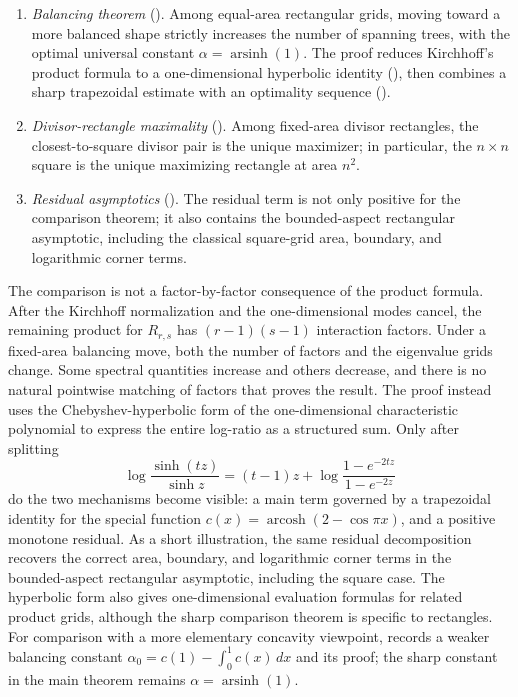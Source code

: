 \documentclass[11pt]{article}
\numberwithin{equation}{section}
\DeclareMathOperator{\arcosh}{arcosh}
\DeclareMathOperator{\arsinh}{arsinh}
\begin{document}
\begin{enumerate}
\setlength{\itemsep}{1pt}
\setlength{\parsep}{0pt}
\setlength{\topsep}{2pt}
        \item[(1)] \emph{Balancing theorem} (\textbf{}). Among equal-area rectangular grids, moving toward a more balanced shape strictly increases the number of spanning trees, with the optimal universal constant $\alpha=\arsinh(1)$. The proof reduces Kirchhoff's product formula to a one-dimensional hyperbolic identity (\textbf{}), then combines a sharp trapezoidal estimate with an optimality sequence (\textbf{}).
\item[(2)] \emph{Divisor-rectangle maximality} (\textbf{}). Among fixed-area divisor rectangles, the closest-to-square divisor pair is the unique maximizer; in particular, the $n\times n$ square is the unique maximizing rectangle at area $n^2$.
\item[(3)] \emph{Residual asymptotics} (\textbf{}). The residual term is not only positive for the comparison theorem; it also contains the bounded-aspect rectangular asymptotic, including the classical square-grid area, boundary, and logarithmic corner terms.
\end{enumerate}

The comparison is not a factor-by-factor consequence of the product formula. After the Kirchhoff normalization and the one-dimensional modes cancel, the remaining product for $R_{r,s}$ has $(r-1)(s-1)$ interaction factors. Under a fixed-area balancing move, both the number of factors and the eigenvalue grids change. Some spectral quantities increase and others decrease, and there is no natural pointwise matching of factors that proves the result. The proof instead uses the Chebyshev-hyperbolic form of the one-dimensional characteristic polynomial to express the entire log-ratio as a structured sum. Only after splitting
\[
  \log\frac{\sinh(tz)}{\sinh z}
  =
  (t-1)z+\log\frac{1-e^{-2tz}}{1-e^{-2z}}
\]
do the two mechanisms become visible: a main term governed by a trapezoidal identity for the special function $c(x)=\arcosh(2-\cos \pi x)$, and a positive monotone residual.
As a short illustration, the same residual decomposition recovers the correct area, boundary, and logarithmic corner terms in the bounded-aspect rectangular asymptotic, including the square case. The hyperbolic form also gives one-dimensional evaluation formulas for related product grids, although the sharp comparison theorem is specific to rectangles.
For comparison with a more elementary concavity viewpoint,  records a weaker balancing constant $\alpha_0=c(1)-\int_0^1 c(x)\,dx$ and its proof; the sharp constant in the main theorem remains $\alpha=\arsinh(1)$.
\end{document}
